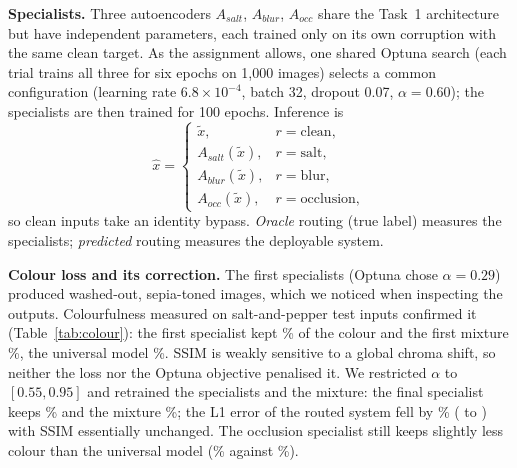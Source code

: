 \textbf{Specialists.} Three autoencoders $A_{salt}$, $A_{blur}$, $A_{occ}$ share the Task~1 architecture but have independent parameters, each trained only on its own corruption with the same clean target. As the assignment allows, one shared Optuna search (each trial trains all three for six epochs on 1,000 images) selects a common configuration (learning rate $6.8\times10^{-4}$, batch 32, dropout 0.07, $\alpha=0.60$); the specialists are then trained for 100 epochs. Inference is
\begin{equation}
\hat{x}=\begin{cases}\tilde{x}, & r=\text{clean},\\ A_{salt}(\tilde{x}), & r=\text{salt},\\ A_{blur}(\tilde{x}), & r=\text{blur},\\ A_{occ}(\tilde{x}), & r=\text{occlusion},\end{cases}
\end{equation}
so clean inputs take an identity bypass. \emph{Oracle} routing (true label) measures the specialists; \emph{predicted} routing measures the deployable system.

\textbf{Colour loss and its correction.} The first specialists (Optuna chose $\alpha=0.29$) produced washed-out, sepia-toned images, which we noticed when inspecting the outputs. Colourfulness measured on \nColourN{} salt-and-pepper test inputs confirmed it (Table~\ref{tab:colour}): the first specialist kept \nColSpSpecFirst\% of the colour and the first mixture \nColSpMoeFirst\%, the universal model \nColSpUniversal\%. SSIM is weakly sensitive to a global chroma shift, so neither the loss nor the Optuna objective penalised it. We restricted $\alpha$ to $[0.55,0.95]$ and retrained the specialists and the mixture: the final specialist keeps \nColSpSpecFinal\% and the mixture \nColSpMoeFinal\%; the L1 error of the routed system fell by \nLOneDropPct\% (\nHardPredLOneFirst{} to \nHardPredLOneFinal{}) with SSIM essentially unchanged. The occlusion specialist still keeps slightly less colour than the universal model (\nColOcSpecFinal\% against \nColOcUniversal\%).

\begin{table}[t]
\centering
\caption{Colour preserved (colourfulness of the output relative to the clean image) on \nColourN{} salt-and-pepper and occlusion test inputs.}\label{tab:colour}
\small
{}
\end{table}

\begin{table}[t]
\centering
\caption{Hard routing on the test protocol: SSIM and L1 of oracle versus predicted routing, and the share of mis-routed inputs.}\label{tab:routing}
\small
{}
\end{table}

